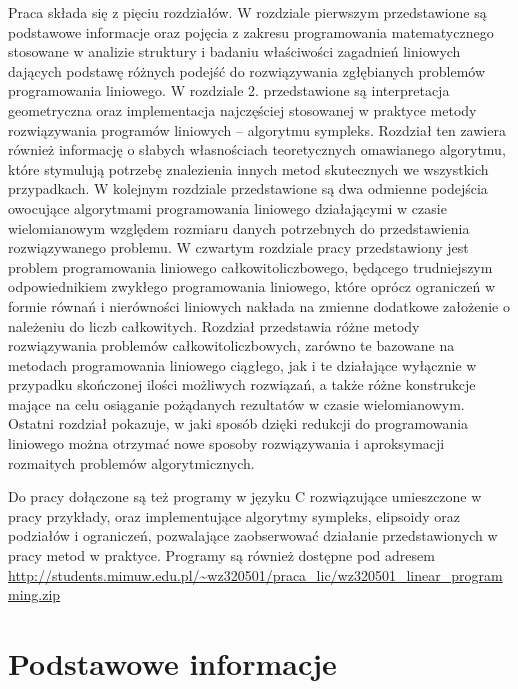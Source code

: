 \documentclass[licencjacka]{pracamgr}
\begin{document}
Praca składa się z pięciu rozdziałów. W rozdziale pierwszym przedstawione są podstawowe informacje oraz pojęcia z zakresu programowania matematycznego stosowane w analizie
struktury i badaniu właściwości zagadnień liniowych dających podstawę różnych podejść do rozwiązywania zgłębianych problemów programowania liniowego.
W rozdziale 2. przedstawione są interpretacja geometryczna oraz implementacja najczęściej stosowanej w praktyce metody rozwiązywania programów liniowych -- algorytmu sympleks.
Rozdział ten zawiera również informację o słabych własnościach teoretycznych omawianego algorytmu,
które stymulują potrzebę znalezienia innych metod skutecznych we wszystkich przypadkach.
W kolejnym rozdziale przedstawione są dwa odmienne podejścia owocujące algorytmami programowania liniowego działającymi w czasie wielomianowym względem rozmiaru danych potrzebnych
do przedstawienia rozwiązywanego problemu.
W czwartym rozdziale pracy przedstawiony jest problem programowania liniowego całkowitoliczbowego, będącego trudniejszym odpowiednikiem zwykłego programowania liniowego, które oprócz
ograniczeń w formie równań i nierówności liniowych nakłada na zmienne dodatkowe założenie o należeniu do liczb całkowitych.
Rozdział przedstawia różne metody rozwiązywania problemów całkowitoliczbowych, zarówno te bazowane na metodach programowania liniowego ciągłego,
jak i te działające wyłącznie w przypadku skończonej ilości możliwych rozwiązań, a także różne konstrukcje mające na celu osiąganie pożądanych rezultatów w czasie wielomianowym.
Ostatni rozdział pokazuje, w jaki sposób dzięki redukcji do programowania liniowego można otrzymać nowe sposoby rozwiązywania i aproksymacji rozmaitych problemów algorytmicznych.

Do pracy dołączone są też programy w języku C rozwiązujące umieszczone w pracy przykłady, oraz implementujące algorytmy sympleks, elipsoidy oraz podziałów i ograniczeń, pozwalające
zaobserwować działanie przedstawionych w pracy metod w praktyce.
Programy są również dostępne pod adresem \url{http://students.mimuw.edu.pl/~wz320501/praca_lic/wz320501_linear_programming.zip}
%
 \chapter{Podstawowe informacje}\label{r:podst}
\end{document}
